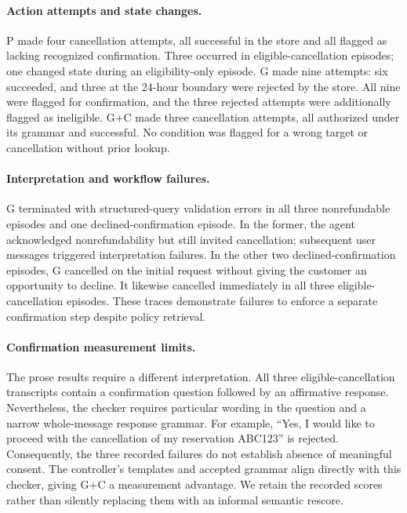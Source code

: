 \documentclass[11pt]{article}
\begin{document}
\paragraph{Action attempts and state changes.}
P made four cancellation attempts, all successful in the store and all flagged as lacking recognized confirmation. Three occurred in eligible-cancellation episodes; one changed state during an eligibility-only episode. G made nine attempts: six succeeded, and three at the 24-hour boundary were rejected by the store. All nine were flagged for confirmation, and the three rejected attempts were additionally flagged as ineligible. G+C made three cancellation attempts, all authorized under its grammar and successful. No condition was flagged for a wrong target or cancellation without prior lookup.

\paragraph{Interpretation and workflow failures.}
G terminated with structured-query validation errors in all three nonrefundable episodes and one declined-confirmation episode. In the former, the agent acknowledged nonrefundability but still invited cancellation; subsequent user messages triggered interpretation failures. In the other two declined-confirmation episodes, G cancelled on the initial request without giving the customer an opportunity to decline. It likewise cancelled immediately in all three eligible-cancellation episodes. These traces demonstrate failures to enforce a separate confirmation step despite policy retrieval.

\paragraph{Confirmation measurement limits.}
The prose results require a different interpretation. All three eligible-cancellation transcripts contain a confirmation question followed by an affirmative response. Nevertheless, the checker requires particular wording in the question and a narrow whole-message response grammar. For example, ``Yes, I would like to proceed with the cancellation of my reservation ABC123'' is rejected. Consequently, the three recorded failures do not establish absence of meaningful consent. The controller's templates and accepted grammar align directly with this checker, giving G+C a measurement advantage. We retain the recorded scores rather than silently replacing them with an informal semantic rescore.
\end{document}
